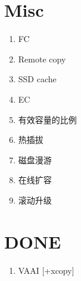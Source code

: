\section{Misc}

\begin{tcolorbox}
\begin{enumerate}
    \item FC
    \item Remote copy
    \item SSD cache
    \item EC
    \item 有效容量的比例
    \item 热插拔
    \item 磁盘漫游
    \item 在线扩容
    \item 滚动升级
\end{enumerate}
\end{tcolorbox}

\section{DONE}

\begin{enumerate}
    \item VAAI [+xcopy]
\end{enumerate}

